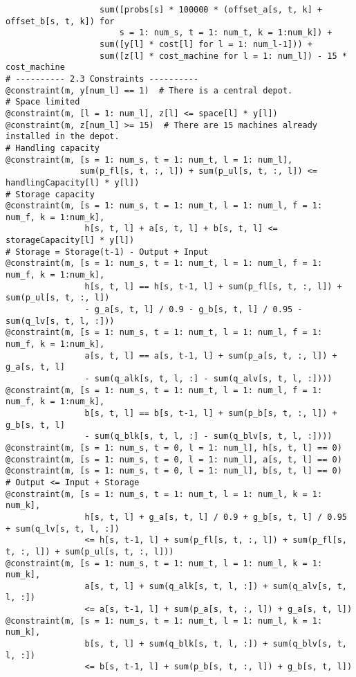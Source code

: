 \documentclass[fleqn,10pt]{wlscirep}
\begin{document}
\begin{lstlisting}
                   sum([probs[s] * 100000 * (offset_a[s, t, k] + offset_b[s, t, k]) for
                       s = 1: num_s, t = 1: num_t, k = 1:num_k]) +
                   sum([y[l] * cost[l] for l = 1: num_l-1])) +
                   sum([z[l] * cost_machine for l = 1: num_l]) - 15 * cost_machine
# ---------- 2.3 Constraints ----------
@constraint(m, y[num_l] == 1)  # There is a central depot.
# Space limited
@constraint(m, [l = 1: num_l], z[l] <= space[l] * y[l])
@constraint(m, z[num_l] >= 15)  # There are 15 machines already installed in the depot.
# Handling capacity
@constraint(m, [s = 1: num_s, t = 1: num_t, l = 1: num_l],
               sum(p_fl[s, t, :, l]) + sum(p_ul[s, t, :, l]) <= handlingCapacity[l] * y[l])
# Storage capacity
@constraint(m, [s = 1: num_s, t = 1: num_t, l = 1: num_l, f = 1: num_f, k = 1:num_k],
                h[s, t, l] + a[s, t, l] + b[s, t, l] <= storageCapacity[l] * y[l])
# Storage = Storage(t-1) - Output + Input
@constraint(m, [s = 1: num_s, t = 1: num_t, l = 1: num_l, f = 1: num_f, k = 1:num_k],
                h[s, t, l] == h[s, t-1, l] + sum(p_fl[s, t, :, l]) + sum(p_ul[s, t, :, l])
                - g_a[s, t, l] / 0.9 - g_b[s, t, l] / 0.95 - sum(q_lv[s, t, l, :]))
@constraint(m, [s = 1: num_s, t = 1: num_t, l = 1: num_l, f = 1: num_f, k = 1:num_k],
                a[s, t, l] == a[s, t-1, l] + sum(p_a[s, t, :, l]) + g_a[s, t, l]
                - sum(q_alk[s, t, l, :] - sum(q_alv[s, t, l, :])))
@constraint(m, [s = 1: num_s, t = 1: num_t, l = 1: num_l, f = 1: num_f, k = 1:num_k],
                b[s, t, l] == b[s, t-1, l] + sum(p_b[s, t, :, l]) + g_b[s, t, l]
                - sum(q_blk[s, t, l, :] - sum(q_blv[s, t, l, :])))
@constraint(m, [s = 1: num_s, t = 0, l = 1: num_l], h[s, t, l] == 0)
@constraint(m, [s = 1: num_s, t = 0, l = 1: num_l], a[s, t, l] == 0)
@constraint(m, [s = 1: num_s, t = 0, l = 1: num_l], b[s, t, l] == 0)
# Output <= Input + Storage
@constraint(m, [s = 1: num_s, t = 1: num_t, l = 1: num_l, k = 1: num_k],
                h[s, t, l] + g_a[s, t, l] / 0.9 + g_b[s, t, l] / 0.95 + sum(q_lv[s, t, l, :])
                <= h[s, t-1, l] + sum(p_fl[s, t, :, l]) + sum(p_fl[s, t, :, l]) + sum(p_ul[s, t, :, l]))
@constraint(m, [s = 1: num_s, t = 1: num_t, l = 1: num_l, k = 1: num_k],
                a[s, t, l] + sum(q_alk[s, t, l, :]) + sum(q_alv[s, t, l, :])
                <= a[s, t-1, l] + sum(p_a[s, t, :, l]) + g_a[s, t, l])
@constraint(m, [s = 1: num_s, t = 1: num_t, l = 1: num_l, k = 1: num_k],
                b[s, t, l] + sum(q_blk[s, t, l, :]) + sum(q_blv[s, t, l, :])
                <= b[s, t-1, l] + sum(p_b[s, t, :, l]) + g_b[s, t, l])

\end{lstlisting}
\end{document}
